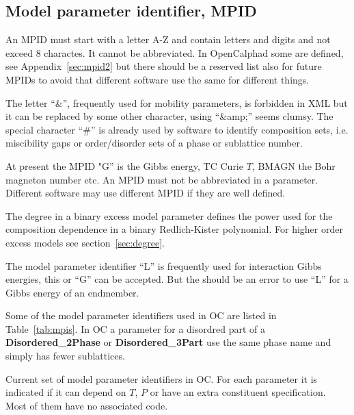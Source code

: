 \documentclass{article}
\begin{document}
\begin{appendices}
\subsection{Model parameter identifier, MPID}\label{sec:mpid}\label{sec:mpid2}

An MPID must start with a letter A-Z and contain letters and digits
and not exceed 8 charactes.  It cannot be abbreviated.  In
OpenCalphad some are defined, see Appendix~\ref{sec:mpid2} but there
should be a reserved list also for future MPIDs to avoid that
different software use the same for different things.
  
The letter ``\&'', frequently used for mobility parameters, is
forbidden in XML but it can be replaced by some other character, using
``\&amp;'' seems clumsy.  The special character ``\#'' is already used
by software to identify composition sets, i.e. miscibility gaps or
order/disorder sets of a phase or sublattice number.

At present the MPID "G'' is the Gibbs energy, TC Curie $T$, BMAGN the
Bohr magneton number etc.  An MPID must not be abbreviated in a
parameter.  Different software may use different MPID if they are well
defined.

The degree in a binary excess model parameter defines the power used
for the composition dependence in a binary Redlich-Kister polynomial.
For higher order excess models see section~\ref{sec:degree}.

The model parameter identifier ``L'' is frequently used for
interaction Gibbs energies, this or ``G'' can be accepted.  But the
should be an error to use ``L'' for a Gibbs energy of an endmember.

Some of the model parameter identifiers used in OC are listed in
Table~\ref{tab:mpis}.  In OC a parameter for a disordred part of a
{\bf Disordered\_2Phase} or {\bf Disordered\_3Part} use the same phase
name and simply has fewer sublattices.

\begin{table}[!h]
  \caption{Current set of model parameter identifiers in OC.  For each
    parameter it is indicated if it can depend on $T$, $P$ or have an
    extra constituent specification.  Most of them have no associated
    code.}\label{tab:mpis}


\end{table}
\end{appendices}
\end{document}
